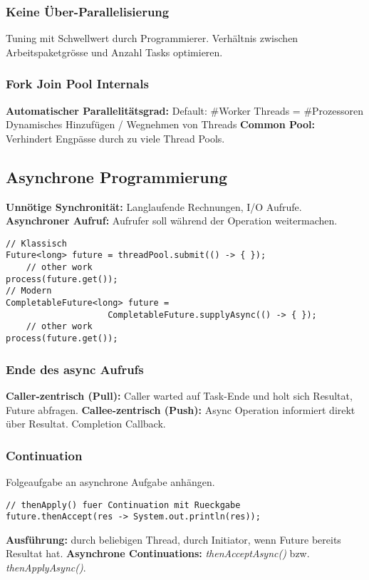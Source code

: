 \subsubsection{Keine Über-Parallelisierung}
Tuning mit Schwellwert durch Programmierer.
Verhältnis zwischen Arbeitspaketgrösse und Anzahl Tasks optimieren.

\subsubsection{Fork Join Pool Internals}
\textbf{Automatischer Parallelitätsgrad:} Default: \#Worker Threads = \#Prozessoren
Dynamisches Hinzufügen / Wegnehmen von Threads
\textbf{Common Pool:} Verhindert Engpässe durch zu viele Thread Pools.


\subsection{Asynchrone Programmierung}
\textbf{Unnötige Synchronität:} Langlaufende Rechnungen, I/O Aufrufe.\\ 
\textbf{Asynchroner Aufruf:} Aufrufer soll während der Operation weitermachen.

\begin{lstlisting}
// Klassisch
Future<long> future = threadPool.submit(() -> { });
    // other work 
process(future.get());
// Modern
CompletableFuture<long> future = 
                    CompletableFuture.supplyAsync(() -> { });
    // other work 
process(future.get());
\end{lstlisting}

\subsubsection{Ende des async Aufrufs}
\textbf{Caller-zentrisch (Pull):} Caller warted auf Task-Ende und holt sich Resultat, Future abfragen.
\textbf{Callee-zentrisch (Push):} Async Operation informiert direkt über Resultat. Completion Callback.

\subsubsection{Continuation}
Folgeaufgabe an asynchrone Aufgabe anhängen.
\begin{lstlisting}
// thenApply() fuer Continuation mit Rueckgabe
future.thenAccept(res -> System.out.println(res));
\end{lstlisting}
\textbf{Ausführung:} durch beliebigen Thread, durch Initiator, wenn Future bereits Resultat hat.
\textbf{Asynchrone Continuations:} \textit{thenAcceptAsync()} bzw. \textit{thenApplyAsync()}.

